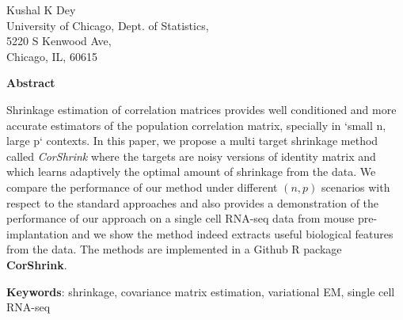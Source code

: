\documentclass[a4paper, 12pt]{article}
\begin{document}
\begin{flushleft}
{\Large
\textbf{} 
}

Kushal K Dey \\
University of Chicago, Dept. of Statistics, \\
5220 S Kenwood Ave, \\
Chicago, IL, 60615 \\
\end{flushleft}

\begin{center}
\textbf{Abstract} \\ \vspace{0.2 in}
\end{center}
\begin{flushleft}
{\small Shrinkage estimation of correlation matrices provides well conditioned and more accurate estimators of the population correlation matrix, specially in `small n, large p` contexts. In this paper, we propose a multi target shrinkage method called \textit{CorShrink} where the targets are noisy versions of identity matrix and which learns adaptively the optimal amount of shrinkage from the data. We compare the performance of our method under different $(n,p)$ scenarios with respect to the standard approaches and also provides a demonstration of the performance of our approach on a single cell RNA-seq data from mouse pre-implantation and we show the method indeed extracts useful biological features from the data. The methods are implemented in a Github R package \textbf{CorShrink}. } \\ \vspace{0.2 in}

\textbf{Keywords}: shrinkage, covariance matrix estimation, variational EM, single cell RNA-seq
\end{flushleft}

\normalsize



\end{document}
